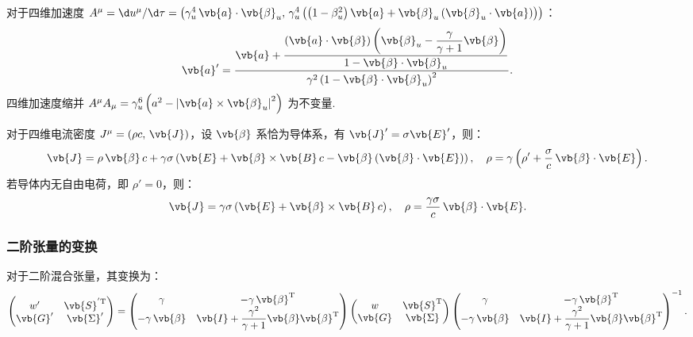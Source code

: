 \begin{example}
	对于四维加速度 \(A^\mu = \d u^\mu/\d \tau = \left( \gamma_u^4 \, \vb{a} \cdot \vb{\beta}_u, \, \gamma_u^4 \left( \left(1 - \beta_u^2\right) \vb{a} + \vb{\beta}_u \left( \vb{\beta}_u \cdot \vb{a} \right) \right) \right)\)：
	\begin{equation*}
		\vb{a}' = \dfrac{ \vb{a} + \dfrac{ \left( \vb{a} \cdot \vb{\beta} \right) \left( \vb{\beta}_u - \dfrac{\gamma}{\gamma + 1} \vb{\beta} \right) }{ 1 - \vb{\beta} \cdot \vb{\beta}_u } }{ \gamma^2 \left( 1 - \vb{\beta} \cdot \vb{\beta}_u \right)^2 }.
	\end{equation*}
	四维加速度缩并 \(A^\mu A_\mu = \gamma_u^6 \left( a^2 - \left| \vb{a} \times \vb{\beta}_u \right|^2 \right)\) 为不变量.
\end{example}

\begin{example}
	对于四维电流密度 \(J^\mu = (\rho c, \, \vb{J})\)，设 \(\vb{\beta}\) 系恰为导体系，有 \(\vb{J}' = \sigma \vb{E}'\)，则：
	\begin{equation*}
		\vb{J} = \rho \, \vb{\beta} \, c + \gamma \sigma \left( \vb{E} + \vb{\beta} \times \vb{B} \, c - \vb{\beta} \left( \vb{\beta} \cdot \vb{E} \right) \right), \quad
		\rho = \gamma \left( \rho' + \dfrac{\sigma}{c} \, \vb{\beta} \cdot \vb{E} \right).
	\end{equation*}
	若导体内无自由电荷，即 \(\rho' = 0\)，则：
	\begin{equation*}
		\vb{J} = \gamma \sigma \left( \vb{E} + \vb{\beta} \times \vb{B} \, c \right), \quad
		\rho = \dfrac{\gamma \sigma}{c} \, \vb{\beta} \cdot \vb{E}.
	\end{equation*}
\end{example}

\subsubsection{二阶张量的变换}

对于二阶混合张量，其变换为：
\begin{equation*}
	\begin{pmatrix}
		w'      & \vb{S}^\mathrm{'T} \\
		\vb{G}' & \vb{\Sigma}'
	\end{pmatrix}
	=
	\begin{pmatrix}
		\gamma                & -\gamma \, \vb{\beta}^\mathrm{T}                                       \\
		-\gamma \, \vb{\beta} & \vb{I} + \dfrac{\gamma^2}{\gamma + 1} \vb{\beta} \vb{\beta}^\mathrm{T}
	\end{pmatrix}
	\begin{pmatrix}
		w      & \vb{S}^\mathrm{T} \\
		\vb{G} & \vb{\Sigma}
	\end{pmatrix}
	\begin{pmatrix}
		\gamma                & -\gamma \, \vb{\beta}^\mathrm{T}                                       \\
		-\gamma \, \vb{\beta} & \vb{I} + \dfrac{\gamma^2}{\gamma + 1} \vb{\beta} \vb{\beta}^\mathrm{T}
	\end{pmatrix}^{-1}.
\end{equation*}


